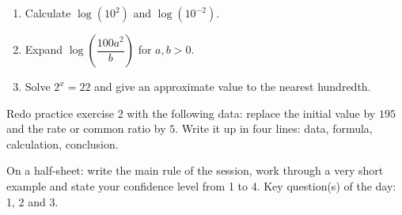 \begin{exercice}[-- essential]
\begin{enumerate}\item Calculate $\log(10^2)$ and $\log(10^{-2})$.\item Expand $\log\!\left(\dfrac{100a^2}{b}\right)$ for $a,b>0$.\item Solve $2^x=22$ and give an approximate value to the nearest hundredth.\end{enumerate}
\end{exercice}


\begin{dm}Redo practice exercise 2 with the following data: replace the initial value by $195$ and the rate or common ratio by $5$. Write it up in four lines: data, formula, calculation, conclusion.\end{dm}

\begin{sortie}On a half-sheet: write the main rule of the session, work through a very short example and state your confidence level from 1 to 4. Key question(s) of the day: 1, 2 and 3.\end{sortie}

